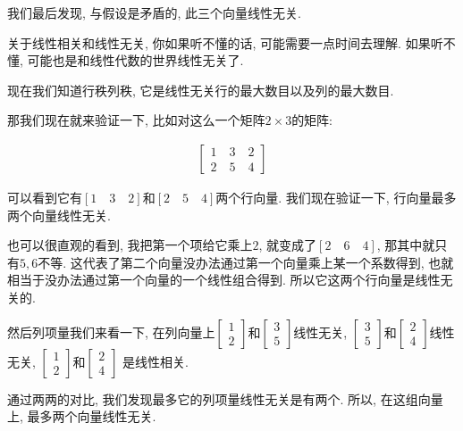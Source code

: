 我们最后发现, 与假设是矛盾的, 此三个向量线性无关. 

关于线性相关和线性无关, 你如果听不懂的话, 可能需要一点时间去理解. 如果听不懂, 可能也是和线性代数的世界线性无关了. 

现在我们知道行秩列秩, 它是线性无关行的最大数目以及列的最大数目. 

那我们现在就来验证一下, 比如对这么一个矩阵$2 \times 3$的矩阵: 

\begin{align*}
  \begin{bmatrix} 1 \quad 3 \quad 2 \\ 2 \quad 5 \quad 4 \end{bmatrix}
\end{align*}

可以看到它有$[1 \quad 3 \quad 2]$和$[2 \quad 5 \quad 4]$两个行向量. 我们现在验证一下, 行向量最多两个向量线性无关. 

也可以很直观的看到, 我把第一个项给它乘上$2$, 就变成了$[2 \quad 6 \quad 4]$,  那其中就只有$5, 6$不等. 这代表了第二个向量没办法通过第一个向量乘上某一个系数得到, 也就相当于没办法通过第一个向量的一个线性组合得到. 所以它这两个行向量是线性无关的. 

然后列项量我们来看一下, 在列向量上$\begin{bmatrix} 1 \\ 2 \end{bmatrix}$和$\begin{bmatrix} 3 \\ 5 \end{bmatrix}$线性无关,  $\begin{bmatrix} 3 \\ 5 \end{bmatrix}$和$\begin{bmatrix} 2 \\ 4\end{bmatrix}$线性无关,  $\begin{bmatrix} 1 \\ 2 \end{bmatrix}$和$\begin{bmatrix} 2 \\ 4 \end{bmatrix}$ 是线性相关. 

通过两两的对比, 我们发现最多它的列项量线性无关是有两个. 所以, 在这组向量上, 最多两个向量线性无关. 
